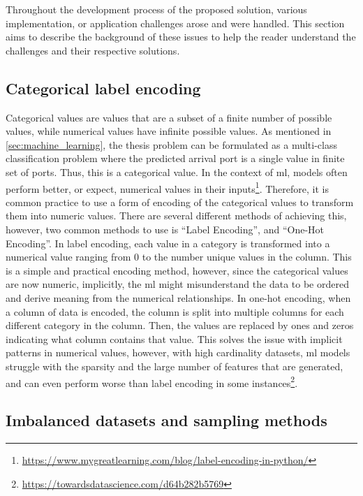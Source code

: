 Throughout the development process of the proposed solution, various implementation, or application challenges arose and were handled. This section aims to describe the background of these issues to help the reader understand the challenges and their respective solutions.

\subsection{Categorical label encoding}
\label{sec:label_encoding}

Categorical values are values that are a subset of a finite number of possible values, while numerical values have infinite possible values. As mentioned in \cref{sec:machine_learning}, the thesis problem can be formulated as a multi-class classification problem where the predicted arrival port is a single value in finite set of ports. Thus, this is a categorical value. In the context of \acrshort{ml}, models often perform better, or expect, numerical values in their inputs\footnote{\url{https://www.mygreatlearning.com/blog/label-encoding-in-python/}}. Therefore, it is common practice to use a form of encoding of the categorical values to transform them into numeric values. There are several different methods of achieving this, however, two common methods to use is ``Label Encoding'', and ``One-Hot Encoding''. In label encoding, each value in a category is transformed into a numerical value ranging from 0 to the number unique values in the column. This is a simple and practical encoding method, however, since the categorical values are now numeric, implicitly, the \acrshort{ml} might misunderstand the data to be ordered and derive meaning from the numerical relationships. In one-hot encoding, when a column of data is encoded, the column is split into multiple columns for each different category in the column. Then, the values are replaced by ones and zeros indicating what column contains that value. This solves the issue with implicit patterns in numerical values, however, with high cardinality datasets, \acrshort{ml} models struggle with the sparsity and the large number of features that are generated, and can even perform worse than label encoding in some instances\footnote{\url{https://towardsdatascience.com/d64b282b5769}}.


\subsection{Imbalanced datasets and sampling methods}

